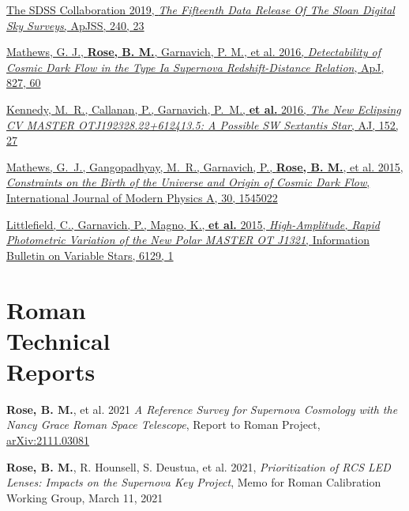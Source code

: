 \documentclass[margin]{res}
\begin{document}
\begin{resume}
\hangindent=15pt 
\href{https://ui.adsabs.harvard.edu/#abs/2018arXiv181202759A/abstract}{The SDSS Collaboration 2019, {\sl The Fifteenth Data Release Of The Sloan Digital Sky Surveys}, ApJSS, 240, 23}
\vspace{-12pt}

\hangindent=15pt 
\href{https://ui.adsabs.harvard.edu/#abs/2016ApJ...827...60M/abstract}{Mathews, G. J., {\bf Rose, B. M.}, Garnavich, P. M., et al. 2016, {\sl Detectability of Cosmic Dark Flow in the Type Ia Supernova Redshift-Distance Relation}, ApJ, 827, 60}

\vspace{-12pt}
\hangindent=15pt 
\href{https://ui.adsabs.harvard.edu/#abs/2016AJ....152...27K/abstract}{Kennedy, M.~R., Callanan, P., Garnavich, P.~M., {\bf et al.} 2016, {\sl The New Eclipsing CV MASTER OTJ192328.22+612413.5: A Possible SW Sextantis Star}, AJ, 152, 27}

\vspace{-12pt}
\hangindent=15pt 
\href{https://ui.adsabs.harvard.edu/#abs/2015IJMPA..3045022M/abstract}{Mathews, G.~J., Gangopadhyay, M.~R., Garnavich, P., {\bf Rose, B. M.}, et al. 2015, {\sl Constraints on the Birth of the Universe and Origin of Cosmic Dark Flow}, International Journal of Modern Physics A, 30, 1545022}

\vspace{-12pt}
\hangindent=15pt 
\href{https://ui.adsabs.harvard.edu/#abs/2015IBVS.6129....1L/abstract}{Littlefield, C., Garnavich, P., Magno, K., {\bf et al.} 2015, {\sl High-Amplitude, Rapid Photometric Variation of the New Polar MASTER OT J1321}, Information Bulletin on Variable Stars, 6129, 1}

\section{Roman\\Technical\\Reports}

\hangindent=15pt
\textbf{Rose, B. M.}, et al. 2021 {\sl A Reference Survey for Supernova Cosmology with the Nancy Grace Roman Space Telescope}, Report to Roman Project,
\href{https://arxiv.org/abs/2111.03081}{arXiv:2111.03081}
\vspace{-12pt}

\hangindent=15pt 
\textbf{Rose, B. M.},  R. Hounsell,  S. Deustua,  et al. 2021, {\sl Prioritization of RCS LED Lenses: Impacts on the Supernova Key Project}, Memo for Roman Calibration Working Group, March 11, 2021
\vspace{-12pt}


\end{resume}
\end{document}
